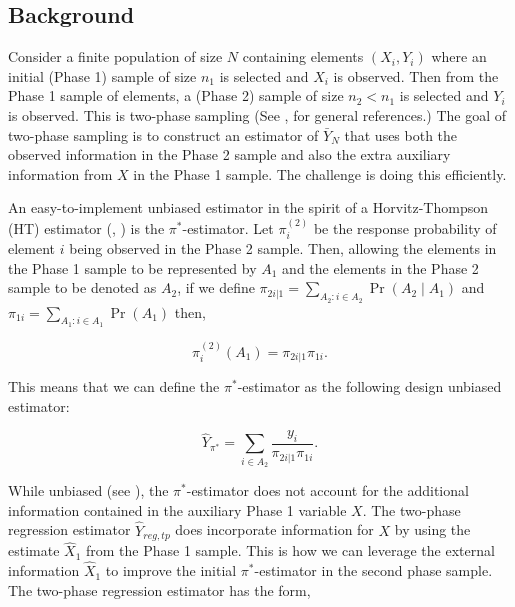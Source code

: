 \documentclass[12pt]{article}
\begin{document}
\subsection{Background}

Consider a finite population of size $N$ containing elements $(X_i, Y_i)$ where
an initial (Phase 1) sample of size $n_1$ is selected and $X_i$ is observed. Then
from the Phase 1 sample of elements, a (Phase 2) sample of size $n_2 < n_1$ is
selected and $Y_i$ is observed. This is two-phase sampling (See 
\cite{fuller2009sampling}, \cite{kim2024statistics} for general references.) The
goal of two-phase sampling is to construct an estimator of $\bar Y_N$ 
that uses both the observed information in the Phase 2 sample and also the extra
auxiliary information from $X$ in the Phase 1 sample.
The challenge is doing this efficiently.

An easy-to-implement unbiased estimator in the spirit of a Horvitz-Thompson (HT)
estimator (\cite{horvitz1952generalization}, \cite{narain1951sampling}) is the
$\pi^*$-estimator. Let $\pi_i^{(2)}$ be the response probability of element $i$
being observed in the Phase 2 sample. Then, allowing the elements in the Phase 1
sample to be represented by $A_1$ and the elements in the Phase 2 sample to be
denoted as $A_2$,
if we define $\pi_{2i | 1} = \sum_{A_2: i \in A_2} \Pr(A_2 \mid A_1)$ and
$\pi_{1i} = \sum_{A_1: i \in A_1} \Pr(A_1)$ then,

$$ \pi_i^{(2)}(A_1) = \pi_{2i | 1} \pi_{1i}.$$

This means that we can define the $\pi^*$-estimator as the following design
unbiased estimator:

$$ \hat Y_{\pi^*} = \sum_{i \in A_2} \frac{y_i}{\pi_{2i | 1} \pi_{1i}}.$$

While unbiased (see \cite{kim2024statistics}), the $\pi^*$-estimator
does not account for the additional information contained in the auxiliary Phase
1 variable $X$. The two-phase regression estimator $\hat Y_{reg, tp}$ does incorporate 
information for $X$ by using the estimate $\hat X_1$ from the Phase 1 sample.
This is how we can leverage the external information $\hat X_1$ to improve the
initial $\pi^*$-estimator in the second phase sample.
The two-phase regression estimator has the form,
\end{document}
